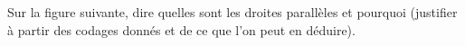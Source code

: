 
\begin{exercice}\label{exo2smath-0326}

    Sur la figure suivante, dire quelles sont les droites parallèles et pourquoi (justifier à partir des codages donnés et de ce que l'on peut en déduire).
\begin{center}
    
\end{center}

\end{exercice}
